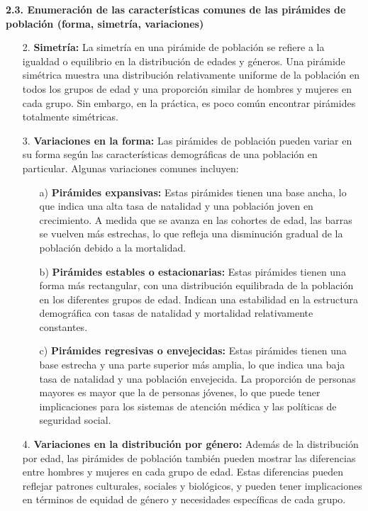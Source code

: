 \documentclass[8pt,a4paper]{beamer}
\begin{document}
{\begin{frame}{}
\begin{block}{\textbf{2.3. Enumeración de las características comunes de las pirámides de población (forma, simetría, variaciones)}}
\begin{enumerate}
\item[2.] \textbf{Simetría:} La simetría en una pirámide de población se refiere a la igualdad o equilibrio en la distribución de edades y géneros. Una pirámide simétrica muestra una distribución relativamente uniforme de la población en todos los grupos de edad y una proporción similar de hombres y mujeres en cada grupo. Sin embargo, en la práctica, es poco común encontrar pirámides totalmente simétricas.
\end{enumerate}
\end{block}
\end{frame}

\begin{frame}{}
\justifying
\begin{block}{}
\justifying
\begin{enumerate}
\justifying
\item[3.] \textbf{Variaciones en la forma:} Las pirámides de población pueden variar en su forma según las características demográficas de una población en particular. Algunas variaciones comunes incluyen:
\begin{itemize}
\justifying
\item[a)] \textbf{Pirámides expansivas:} Estas pirámides tienen una base ancha, lo que indica una alta tasa de natalidad y una población joven en crecimiento. A medida que se avanza en las cohortes de edad, las barras se vuelven más estrechas, lo que refleja una disminución gradual de la población debido a la mortalidad.

\item[b)] \textbf{Pirámides estables o estacionarias:} Estas pirámides tienen una forma más rectangular, con una distribución equilibrada de la población en los diferentes grupos de edad. Indican una estabilidad en la estructura demográfica con tasas de natalidad y mortalidad relativamente constantes.

\item[c)] \textbf{Pirámides regresivas o envejecidas:} Estas pirámides tienen una base estrecha y una parte superior más amplia, lo que indica una baja tasa de natalidad y una población envejecida. La proporción de personas mayores es mayor que la de personas jóvenes, lo que puede tener implicaciones para los sistemas de atención médica y las políticas de seguridad social.
\end{itemize}

\item[4.] \textbf{Variaciones en la distribución por género:} Además de la distribución por edad, las pirámides de población también pueden mostrar las diferencias entre hombres y mujeres en cada grupo de edad. Estas diferencias pueden reflejar patrones culturales, sociales y biológicos, y pueden tener implicaciones en términos de equidad de género y necesidades específicas de cada grupo.
\end{enumerate}
\end{block}
\end{frame}


}
\end{document}
